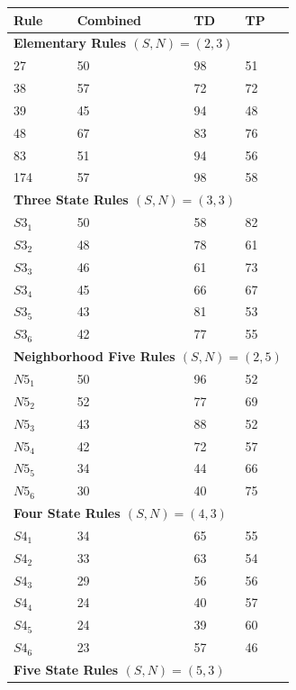 \documentclass{elsarticle}
\begin{document}
\begin{multicols}{2}
\begin{table}[H] \centering
\begin{tabular}{|l|l|l|l|}
\hline
\textbf{Rule} & \textbf{Combined} & \textbf{TD} & \textbf{TP} \\ \hline
\multicolumn{4}{|l|}{\textbf{Elementary Rules \boldmath$(S,N) = (2,3)$}} \\ 
\hline
27 & 50 & 98 & 51 \\ \hline
38 & 57 & 72 & 72 \\ \hline
39 & 45 & 94 & 48 \\ \hline
48 & 67 & 83 & 76 \\ \hline
83 & 51 & 94 & 56 \\ \hline
174 & 57 & 98 & 58 \\ \hline
   \multicolumn{4}{|l|}{\textbf{Three State Rules \boldmath$(S,N) = (3,3)$}} \\ 
   \hline
$S3_{1}$ & 50 & 58 & 82 \\ \hline
$S3_{2}$ & 48 & 78 & 61 \\ \hline
$S3_{3}$ & 46 & 61 & 73 \\ \hline
$S3_{4}$ & 45 & 66 & 67 \\ \hline
$S3_{5}$ & 43 & 81 & 53 \\ \hline
$S3_{6}$ & 42 & 77 & 55 \\ \hline
\multicolumn{4}{|l|}{\textbf{Neighborhood Five Rules \boldmath$(S,N) = (2,5)$}} 
\\ \hline
$N5_{1}$ & 50 & 96 & 52 \\ \hline
$N5_{2}$ & 52 & 77 & 69 \\ \hline
$N5_{3}$ & 43 & 88 & 52 \\ \hline
$N5_{4}$ & 42 & 72 & 57 \\ \hline
$N5_{5}$ & 34 & 44 & 66 \\  \hline
$N5_{6}$ & 30 & 40 & 75 \\ \hline
\multicolumn{4}{|l|}{\textbf{Four State Rules \boldmath$(S,N) = (4,3)$}} \\ 
\hline
$S4_{1}$ & 34 & 65 & 55 \\ \hline
$S4_{2}$ & 33 & 63 & 54 \\ \hline
$S4_{3}$ & 29 & 56 & 56 \\ \hline
$S4_{4}$ & 24 & 40 & 57 \\ \hline
$S4_{5}$ & 24 & 39 & 60 \\ \hline
$S4_{6}$ & 23 & 57 & 46 \\ \hline
\multicolumn{4}{|l|}{\textbf{Five State Rules \boldmath$(S,N) = (5,3)$}} \\ 

\end{tabular}
\end{table}
\end{multicols}
\end{document}
